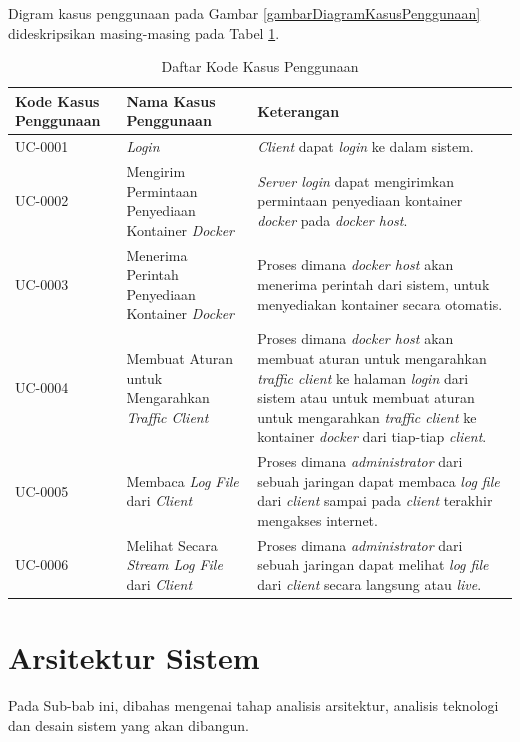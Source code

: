 Digram kasus penggunaan pada Gambar \ref{gambarDiagramKasusPenggunaan} dideskripsikan masing-masing pada Tabel \ref{tabelKodeKasusPenggunaan}.
\begin{longtable}{|p{}|p{}|p{}|} %
	
	\caption{Daftar Kode Kasus Penggunaan} \label{tabelKodeKasusPenggunaan} \\
	\hline
	\textbf{Kode Kasus Penggunaan} & \textbf{Nama Kasus Penggunaan} & \textbf{Keterangan} \\ \hline
	
	\endhead
	\endfoot
	\endlastfoot
	
	UC-0001 & \textit{Login} & \textit{Client} dapat \textit{login} ke dalam sistem. \\ \hline
	UC-0002 & Mengirim Permintaan Penyediaan Kontainer \textit{Docker} & \textit{Server login} dapat mengirimkan permintaan penyediaan kontainer \textit{docker} pada \textit{docker host}. \\ \hline
	UC-0003 & Menerima Perintah Penyediaan Kontainer \textit{Docker}  &  Proses dimana \textit{docker host} akan menerima perintah dari sistem, untuk menyediakan kontainer secara otomatis.\\ \hline
	UC-0004 & Membuat Aturan untuk Mengarahkan \textit{Traffic Client}  &  Proses dimana \textit{docker host} akan membuat aturan untuk mengarahkan \textit{traffic client} ke halaman \textit{login} dari sistem atau untuk membuat aturan untuk mengarahkan \textit{traffic client} ke kontainer \textit{docker} dari tiap-tiap \textit{client}. \\ \hline
	UC-0005 & Membaca \textit{Log File} dari \textit{Client}  &  Proses dimana \textit{administrator} dari sebuah jaringan dapat membaca \textit{log file} dari \textit{client} sampai pada \textit{client} terakhir mengakses internet.\\ \hline
	UC-0006 & Melihat Secara \textit{Stream Log File} dari \textit{Client}  &  Proses dimana \textit{administrator} dari sebuah jaringan dapat melihat \textit{log file} dari \textit{client} secara langsung atau \textit{live}.\\ \hline
\end{longtable}

\section{Arsitektur Sistem}
Pada Sub-bab ini, dibahas mengenai tahap analisis arsitektur, analisis teknologi dan desain sistem yang akan dibangun.
